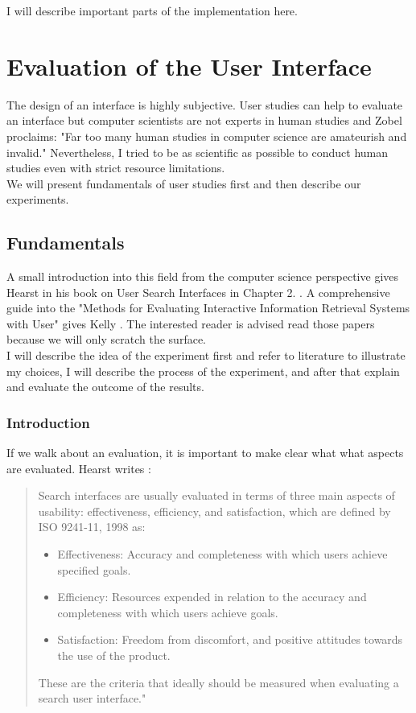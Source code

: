 \documentclass[11pt]{report}
\begin{document}
I will describe important parts of the implementation here.

\chapter{Evaluation of the User Interface}

The design of an interface is highly subjective. User studies can help to evaluate an interface but computer scientists are not experts in human studies and Zobel \cite{Zobel2004} proclaims: "Far too many human studies in computer science are amateurish and invalid." Nevertheless, I tried to be as scientific as possible to conduct human studies even with strict resource limitations. \\

We will present fundamentals of user studies first and then describe our experiments.

\section{Fundamentals}

A small introduction into this field from the computer science perspective gives Hearst in his book on User Search Interfaces in Chapter 2. \cite{Hearst2009}. A comprehensive guide into the "Methods for Evaluating Interactive Information Retrieval Systems with User" gives Kelly \cite{Kelly2007} . The interested reader is advised read those papers because we will only scratch the surface. \\ 


I will describe the idea of the experiment first and refer to literature to illustrate my choices, I will describe the process of the experiment, and after that explain and evaluate the outcome of the results.

\subsection{Introduction}
  If we walk about an evaluation, it is important to make clear what what aspects are evaluated. Hearst writes \cite{Hearst2009}:
  \begin{quote}
  Search interfaces are usually evaluated in terms of three main aspects of usability: effectiveness, efficiency, and satisfaction, which are defined by ISO 9241-11, 1998 \cite{ISO} as:
\begin{itemize}
	\item Effectiveness: Accuracy and completeness with which users achieve specified goals.
	\item Efficiency: Resources expended in relation to the accuracy and completeness with which users achieve goals.
	\item Satisfaction: Freedom from discomfort, and positive attitudes towards the use of the product.
\end{itemize}
These are the criteria that ideally should be measured when evaluating a search user interface."
\end{quote}
\end{document}
